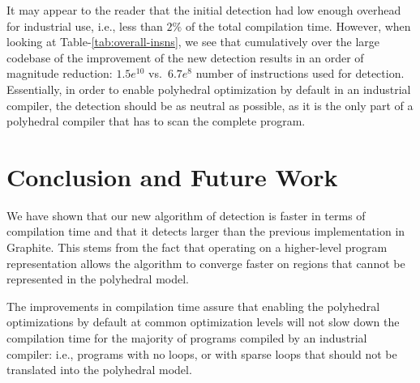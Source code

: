 \documentclass{sig-alternate}
\begin{document}
It may appear to the reader that the initial \SCoP{} detection had low enough
overhead for industrial use, i.e., less than $2\%$ of the total compilation
time.  However, when looking at Table-\ref{tab:overall-insns}, we see that
cumulatively over the large codebase of \GCC{,} the improvement of the new
\SCoP{} detection results in an order of magnitude reduction: $1.5e^{10}$
vs{.}{~}$6.7e^8$ number of instructions used for \SCoP{} detection.
Essentially, in order to enable polyhedral optimization by default in an
industrial compiler, the \SCoP{} detection should be as neutral as possible, as
it is the only part of a polyhedral compiler that has to scan the complete
program.

\begin{table}[h!]
  \begin{center}
  \end{center}
  \caption{Overall number of instructions spent in \SCoP{} detection.}
  \label{tab:overall-insns}
\end{table}

\section{Conclusion and Future Work}
We have shown that our new algorithm of \SCoP{} detection is faster in terms of
compilation time and that it detects larger  than the previous
implementation in Graphite.  This stems from the fact that operating on a
higher-level program representation allows the algorithm to converge faster on
regions that cannot be represented in the polyhedral model.

The improvements in compilation time assure that enabling the polyhedral
optimizations by default at common optimization levels will not slow down the
compilation time for the majority of programs compiled by an industrial
compiler: i.e., programs with no loops, or with sparse loops that should not be
translated into the polyhedral model.
\end{document}
